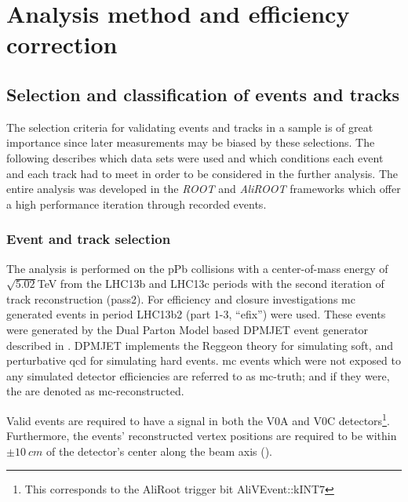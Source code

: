 \chapter{Analysis method and efficiency correction}
\label{chap:methods}



\section{Selection and classification of events and tracks}
\label{sec:event_track_selection}
The selection criteria for validating events and tracks in a sample is of great importance since later measurements may be biased by these selections. The following describes which data sets were used and which conditions each event and each track had to meet in order to be considered in the further analysis. The entire analysis was developed in the \emph{ROOT} and \emph{AliROOT} frameworks which offer a high performance iteration through recorded events. 
 


\subsection{Event and track selection}
\label{sec:event_selection}
The analysis is performed on the \gls{pPb} collisions with a center-of-mass energy of $\sqrt{5.02}$\si{TeV} from the LHC13b and LHC13c periods with the second iteration of track reconstruction (pass2). For efficiency and closure investigations \gls{mc} generated events in period LHC13b2 (part 1-3, ``efix'')  were used. These events were generated by the Dual Parton Model based DPMJET event generator described in \cite{Roesler2000}. DPMJET implements the Reggeon theory for simulating soft, and perturbative \gls{qcd} for simulating hard events. \gls{mc} events which were not exposed to any simulated detector efficiencies are referred to as \gls{mc}-truth; and if they were, the are denoted as \gls{mc}-reconstructed.

Valid events are required to have a signal in both the V0A and V0C detectors\footnote{This corresponds to the AliRoot trigger bit AliVEvent::kINT7}. Furthermore, the events' reconstructed vertex positions are required to be within $\pm \SI{10}{cm}$ of the detector's center along the beam axis (\zvtx).

